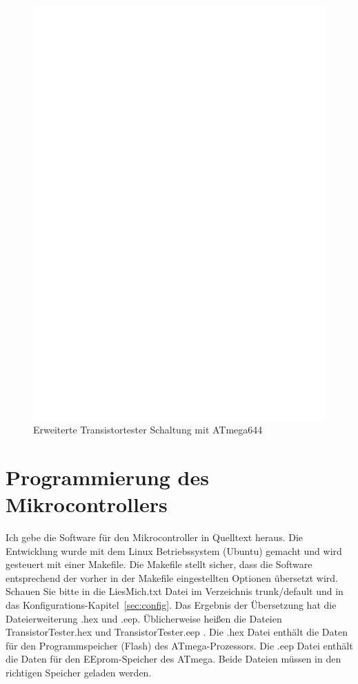 \begin{figure}[H]
\centering
\includegraphics[width=18cm]{../FIG/t644tester.eps}
\caption{Erweiterte Transistortester Schaltung mit ATmega644}
\label{fig:t644tester}
\end{figure}

\section{Programmierung des Mikrocontrollers}
Ich gebe die Software für den Mikrocontroller in Quelltext heraus.
Die Entwicklung wurde mit dem Linux Betriebssystem (Ubuntu) gemacht
und wird gesteuert mit einer Makefile.
Die Makefile stellt sicher, dass die Software entsprechend der vorher in der Makefile 
eingestellten Optionen übersetzt wird. Schauen Sie bitte in die LiesMich.txt Datei
im Verzeichnis trunk/default und in das Konfigurations-Kapitel~\ref{sec:config}.
Das Ergebnis der Übersetzung hat die Dateierweiterung .hex und .eep.
Üblicherweise heißen die Dateien TransistorTester.hex und TransistorTester.eep .
Die .hex Datei enthält die Daten für den Programmspeicher (Flash) des ATmega-Prozessors.
Die .eep Datei enthält die Daten für den EEprom-Speicher des ATmega.
Beide Dateien müssen in den richtigen Speicher geladen werden.

